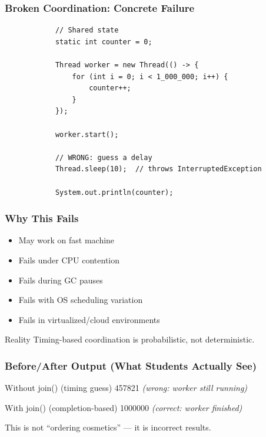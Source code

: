 \documentclass[aspectratio=169,11pt]{beamer}
\begin{document}
	\begin{frame}[fragile]
		\frametitle{Broken Coordination: Concrete Failure}
		
		\begin{lstlisting}
			// Shared state
			static int counter = 0;
			
			Thread worker = new Thread(() -> {
				for (int i = 0; i < 1_000_000; i++) {
					counter++;
				}
			});
			
			worker.start();
			
			// WRONG: guess a delay
			Thread.sleep(10);  // throws InterruptedException
			
			System.out.println(counter);
		\end{lstlisting}
		
	\end{frame}
	
	\begin{frame}
		\frametitle{Why This Fails}
		
		\begin{itemize}
			\item May work on fast machine
			\item Fails under CPU contention
			\item Fails during GC pauses
			\item Fails with OS scheduling variation
			\item Fails in virtualized/cloud environments
		\end{itemize}
		
		\vspace{6mm}
		
		\begin{block}{Reality}
			Timing-based coordination is probabilistic, not deterministic.
		\end{block}
		
	\end{frame}
	
	\begin{frame}
		\frametitle{Before/After Output (What Students Actually See)}
		
		\begin{block}{Without join() (timing guess)}
			\ttfamily\small
			457821 \quad \textit{(wrong: worker still running)}
		\end{block}
		
		\vspace{4mm}
		
		\begin{block}{With join() (completion-based)}
			\ttfamily\small
			1000000 \quad \textit{(correct: worker finished)}
		\end{block}
		
		\vspace{3mm}
		
		\begin{center}
			\Large
			This is not ``ordering cosmetics'' — it is incorrect results.
		\end{center}
		
	\end{frame}
	
\end{document}
